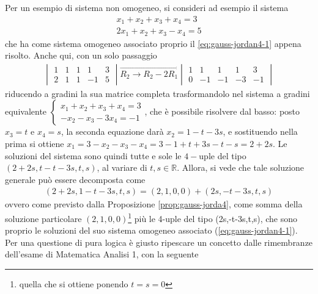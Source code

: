 Per un esempio di sistema non omogeneo, si consideri ad esempio il sistema
\begin{eqnarray*}
  x_1+x_2+x_3+x_4=3\\
  2x_1+x_2+x_3-x_4=5
\end{eqnarray*}
che ha come sistema omogeneo associato proprio il \ref{eq:gauss-jordan4-1} appena
risolto. Anche qui, con un solo passaggio
\begin{eqnarray*}
  \begin{vmatrix}
    1 & 1 & 1 & 1 & 3\\
    2 & 1 & 1 & -1 & 5
  \end{vmatrix}\overrightarrow{R_2\to R_2-2R_1}
  \begin{vmatrix}
    1 & 1 & 1 & 1 & 3\\
    0 & -1 & -1 & -3 & -1
  \end{vmatrix}
\end{eqnarray*}
riducendo a gradini la sua matrice completa trasformandolo nel sistema a gradini equivalente
$
\begin{cases}
  x_1+x_2+x_3+x_4=3\\
  -x_2-x_3-3x_4=-1
\end{cases}
$, che è possibile risolvere dal basso: posto $x_3=t$ e $x_4=s$, la seconda equazione darà
$x_2=1-t-3s$, e sostituendo nella prima si ottiene $x_1=3-x_2-x_3-x_4=3-1+t+3s-t-s=2+2s$.
Le soluzioni del sistema sono quindi tutte e sole le $4-$uple del tipo $(2+2s, t-t-3s,t,s)$,
al variare di $t,s\in \mathds{R}$. Allora, si vede che tale soluzione generale può essere
decomposta come
\begin{eqnarray*}
  (2+2s,1-t-3s,t,s)=(2,1,0,0)+(2s,-t-3s,t,s)
\end{eqnarray*}
ovvero come previsto dalla Proposizione \ref{prop:gauss-jorda4}, come somma della soluzione
particolare $(2,1,0,0)$\footnote{quella che si ottiene ponendo $t=s=0$} più le 4-uple del tipo
(2s,-t-3s,t,s), che sono proprio le soluzioni del suo sistema omogeneo associato
(\ref{eq:gauss-jordan4-1}).\\
Per una questione di pura logica è giusto ripescare un concetto dalle rimembranze dell'esame
di Matematica Analisi 1, con la seguente
